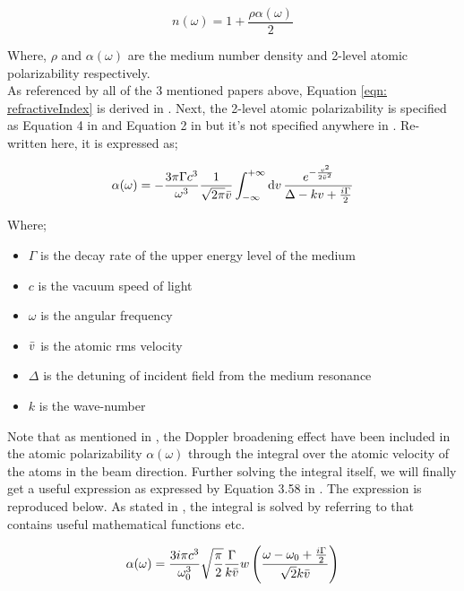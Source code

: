 \begin{equation}
    n(\omega) = 1 + \frac{\rho \alpha(\omega)}{2}
    \label{eqn: refractiveIndex}
\end{equation}

Where, $\rho$ and $\alpha(\omega)$ are the medium number density and 2-level atomic polarizability respectively.\\

As referenced by all of the 3 mentioned papers above, Equation \ref{eqn: refractiveIndex} is derived in \cite{hecht1974optics}. Next, the 2-level atomic polarizability is specified as Equation 4 in \cite{Kwong2014} and Equation 2 in \cite{Kwong2015} but it's not specified anywhere in \cite{Chalony2011}. Re-written here, it is expressed as;

\begin{equation}
    \alpha(\omega) = -\frac{3\pi\Gamma c^{3}}{\omega^{3}} \frac{1}{\sqrt{2\pi}\Bar{v}} \int_{-\infty}^{+\infty} \dd{v} \frac{e^{-\frac{v^{2}}{2\Bar{v}^{2}}}}{\Delta - kv + \frac{i\Gamma}{2}}
    \label{eqn: alphaGeneral}
\end{equation}

Where;

\begin{itemize}
    \item $\Gamma$ is the decay rate of the upper energy level of the medium
    \item $c$ is the vacuum speed of light
    \item $\omega$ is the angular frequency
    \item $\Bar{v}$ is the atomic rms velocity 
    \item $\Delta$ is the detuning of incident field from the medium resonance
    \item $k$ is the wave-number
\end{itemize}

Note that as mentioned in \cite{Kwong2014, Kwong2015}, the Doppler broadening effect have been included in the atomic polarizability $\alpha(\omega)$ through the integral over the atomic velocity of the atoms in the beam direction. Further solving the integral itself, we will finally get a useful expression as expressed by Equation 3.58 in \cite{Kwong2017}. The expression is reproduced below. As stated in \cite{Kwong2017}, the integral is solved by referring to \cite{10.5555/1098650} that contains useful mathematical functions etc.

\begin{equation}
    \alpha(\omega) = \frac{3i\pi c^{3}}{\omega_{0}^{3}} \sqrt{\frac{\pi}{2}} \frac{\Gamma}{k\Bar{v}} w\left(\frac{\omega - \omega_{0} + \frac{i\Gamma}{2}}{\sqrt{2}k\Bar{v}}\right)
    \label{eqn: alphaSolved}
\end{equation}

